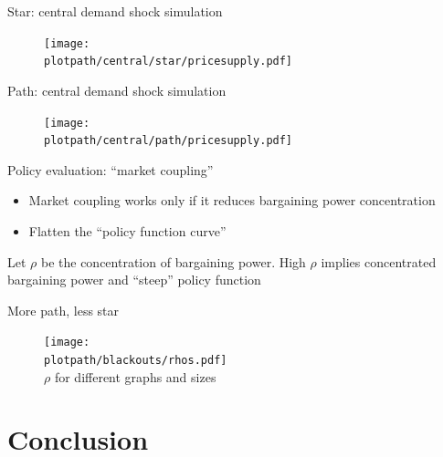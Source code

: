\documentclass{beamer}
\newcommand{\plotpath}{../../plots}
\begin{document}
\begin{frame}{Star: central demand shock simulation}
    \begin{figure}[H]
        \centering
        \texttt{[image: \\plotpath/central/star/pricesupply.pdf]}
    \end{figure}

\end{frame}

\begin{frame} {Path: central demand shock simulation}
    \begin{figure}[H]
        \centering
        \texttt{[image: \\plotpath/central/path/pricesupply.pdf]}
    \end{figure}
\end{frame}

\begin{frame}{Policy evaluation: ``market coupling''}
    \begin{itemize} \setlength\itemsep{2em}
        \item Market coupling works only if it reduces bargaining power concentration \pause
        \item Flatten the ``policy function curve'' \pause
    \end{itemize}

    \hfill

    Let $\rho$ be the concentration of bargaining power. High $\rho$ implies concentrated bargaining power and ``steep'' policy function
\end{frame}

\begin{frame}[allowframebreaks]{More path, less star}

    \centering
    \resizebox{0.7\textwidth}{!}{}



    \begin{figure}
        \texttt{[image: \\plotpath/blackouts/rhos.pdf]}
        \\ $\rho$ for different graphs and sizes
    \end{figure}

\end{frame}

\section{Conclusion}
\end{document}
